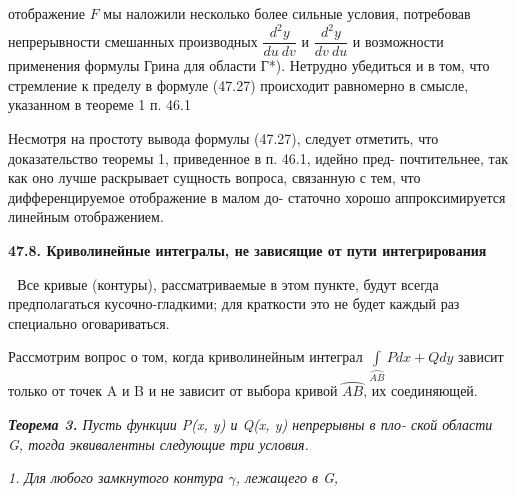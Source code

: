 \documentclass[10pt]{book}
\begin{document}
	
	\noindent отображение $F$ мы наложили несколько более сильные условия,\linebreak
	потребовав непрерывности смешанных производных $\dfrac{d^2y}{du \ dv}$ и $\dfrac{d^2y}{dv \ du}$ и\linebreak
	возможности применения формулы Грина для области {Г*}). Нетрудно \linebreak
	убедиться и в том, что стремление к пределу в формуле (47.27) \linebreak
	происходит равномерно в смысле, указанном в теореме 1 п. 46.1 \par
	
	Несмотря на простоту вывода формулы (47.27), следует отметить, \linebreak
		что доказательство теоремы 1, приведенное в п. 46.1, идейно пред- \linebreak
		почтительнее, так как оно лучше раскрывает сущность вопроса, \linebreak
		связанную с тем, что дифференцируемое отображение в малом до- \linebreak
		статочно хорошо аппроксимируется линейным отображением. \par
	\begin{center}
		{\textbf{47.8. Криволинейные интегралы, не зависящие \linebreak от пути интегрирования}}
	\end{center}	
	
	
	\,\,\,\,Все кривые (контуры), рассматриваемые в этом пункте,\linebreak
	будут всегда предполагаться кусочно-гладкими; для краткости это\linebreak
	не будет каждый раз специально оговариваться.\par
	
	Рассмотрим вопрос о том, когда криволинейным интеграл \linebreak
	$\int\limits_{\wideparen{AB}} P dx + Q dy$ зависит только от точек A и B и не зависит от выбора \linebreak
	кривой $\wideparen{AB}$, их соединяющей. \par 
	
	\textit{\textbf{Теорема 3.} Пусть функции P(x, y) и Q(x, y) непрерывны в пло-\linebreak 
	ской области G, тогда эквивалентны следующие три условия.} \par
	
		
	 \textit{1. Для любого замкнутого контура $\gamma$, лежащего в G,} \par 
	
\end{document}
